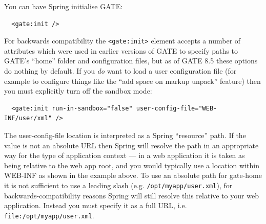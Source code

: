 You can have Spring initialise GATE:
\begin{small}\begin{verbatim}
  <gate:init />
\end{verbatim}\end{small}
%
For backwards compatibility the \verb!<gate:init>! element accepts a number of
attributes which were used in earlier versions of GATE to specify paths to
GATE's ``home'' folder and configuration files, but as of GATE 8.5 these
options do nothing by default.  If you \emph{do} want to load a user
configuration file (for example to configure things like the ``add space on
markup unpack'' feature) then you must explicitly turn off the sandbox mode:
\begin{small}\begin{verbatim}
  <gate:init run-in-sandbox="false" user-config-file="WEB-INF/user/xml" />
\end{verbatim}\end{small}

The user-config-file location is interpreted as a Spring ``resource''
path.  If the value is not an absolute URL then Spring will resolve the path in
an appropriate way for the type of application context --- in a web application
it is taken as being relative to the web app root, and you would typically use
a location within WEB-INF as shown in the example above.  To use an absolute
path for gate-home it is not sufficient to use a leading slash (e.g.
\verb|/opt/myapp/user.xml|), for backwards-compatibility reasons Spring will
still resolve this relative to your web application.  Instead you must specify
it as a full URL, i.e. \verb|file:/opt/myapp/user.xml|.

